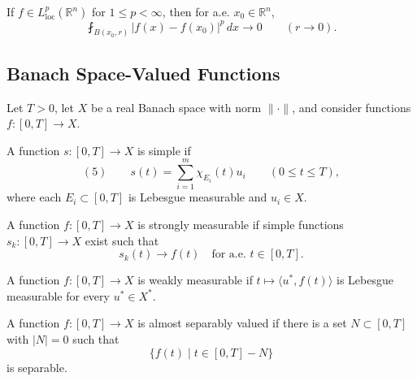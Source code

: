 \begin{remark}
\label{rem:lebesgue-differentiation-lp}

If $f\in L^p_{\mathrm{loc}}(\mathbb R^n)$ for $1\leq p<\infty$, then for a.e.
$x_0\in\mathbb R^n$,
\[
\fint_{B(x_0,r)}|f(x)-f(x_0)|^p\,dx\to0
\qquad(r\to0).
\]
\end{remark}

\subsection{Banach Space-Valued Functions}
\label{sec:banach-space-valued-functions}

Let $T>0$, let $X$ be a real Banach space with norm $\|\cdot\|$, and consider
functions $f:[0,T]\to X$.

\begin{definition}
\label{def:simple-function-banach-valued}

A function $s:[0,T]\to X$ is simple if
\[
(5)\qquad
s(t)=\sum_{i=1}^m\chi_{E_i}(t)u_i
\qquad(0\leq t\leq T),
\]
where each $E_i\subset[0,T]$ is Lebesgue measurable and $u_i\in X$.
\end{definition}

\begin{definition}
\label{def:strongly-measurable-function}

A function $f:[0,T]\to X$ is strongly measurable if simple functions
$s_k:[0,T]\to X$ exist such that
\[
s_k(t)\to f(t)\quad\text{for a.e. }t\in[0,T].
\]
\end{definition}

\begin{definition}
\label{def:weakly-measurable-function}

A function $f:[0,T]\to X$ is weakly measurable if
$t\mapsto\langle u^*,f(t)\rangle$ is Lebesgue measurable for every $u^*\in X^*$.
\end{definition}

\begin{definition}
\label{def:almost-separably-valued}

A function $f:[0,T]\to X$ is almost separably valued if there is a set
$N\subset[0,T]$ with $|N|=0$ such that
\[
\{f(t)\mid t\in[0,T]-N\}
\]
is separable.
\end{definition}

